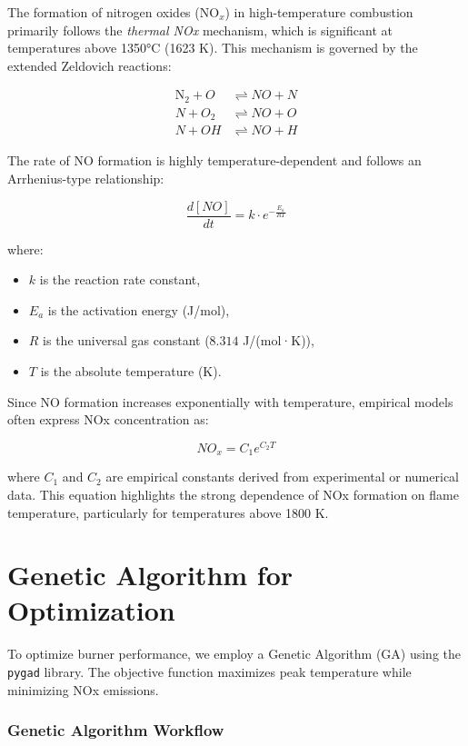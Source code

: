\documentclass[12pt]{report}
\begin{document}
The formation of nitrogen oxides (NO$_{x}$) in high-temperature combustion primarily follows the \textit{thermal NOx} mechanism, which is significant at temperatures above 1350°C (1623 K). This mechanism is governed by the extended Zeldovich reactions:

\begin{align}
    \text{N}_2 + O &\rightleftharpoons NO + N \\
    N + O_2 &\rightleftharpoons NO + O \\
    N + OH &\rightleftharpoons NO + H
\end{align}

The rate of NO formation is highly temperature-dependent and follows an Arrhenius-type relationship:

\begin{equation}
    \frac{d[NO]}{dt} = k \cdot e^{-\frac{E_a}{RT}}
\end{equation}

where:
\begin{itemize}
    \item $k$ is the reaction rate constant,
    \item $E_a$ is the activation energy (J/mol),
    \item $R$ is the universal gas constant ($8.314$ J/(mol·K)),
    \item $T$ is the absolute temperature (K).
\end{itemize}

Since NO formation increases exponentially with temperature, empirical models often express NOx concentration as:

\begin{equation}
    NO_x = C_1 e^{C_2 T}
\end{equation}

where $C_1$ and $C_2$ are empirical constants derived from experimental or numerical data. This equation highlights the strong dependence of NOx formation on flame temperature, particularly for temperatures above 1800 K. 

\section{Genetic Algorithm for Optimization}
To optimize burner performance, we employ a Genetic Algorithm (GA) using the \texttt{pygad} library. The objective function maximizes peak temperature while minimizing NOx emissions.




\subsubsection{Genetic Algorithm Workflow}
\end{document}
